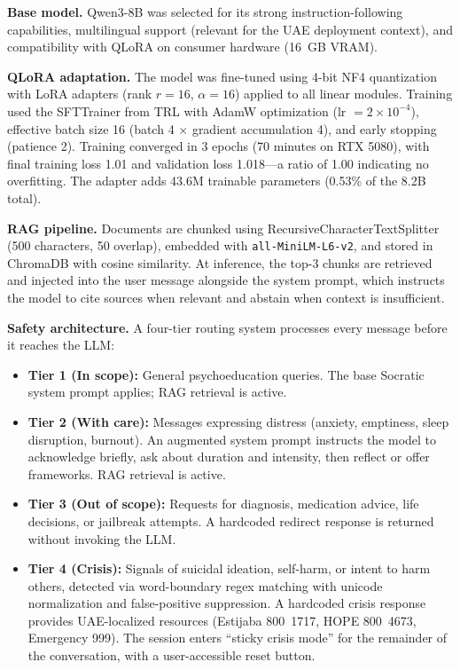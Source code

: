 \documentclass[conference]{IEEEtran}
\begin{document}
\textbf{Base model.} Qwen3-8B was selected for its strong instruction-following capabilities, multilingual support (relevant for the UAE deployment context), and compatibility with QLoRA on consumer hardware (16~GB VRAM).

\textbf{QLoRA adaptation.} The model was fine-tuned using 4-bit NF4 quantization with LoRA adapters (rank $r=16$, $\alpha=16$) applied to all linear modules. Training used the SFTTrainer from TRL with AdamW optimization (lr $= 2 \times 10^{-4}$), effective batch size 16 (batch 4 $\times$ gradient accumulation 4), and early stopping (patience 2). Training converged in 3 epochs (70 minutes on RTX 5080), with final training loss 1.01 and validation loss 1.018---a ratio of 1.00 indicating no overfitting. The adapter adds 43.6M trainable parameters (0.53\% of the 8.2B total).

\textbf{RAG pipeline.} Documents are chunked using RecursiveCharacterTextSplitter (500 characters, 50 overlap), embedded with \texttt{all-MiniLM-L6-v2}, and stored in ChromaDB with cosine similarity. At inference, the top-3 chunks are retrieved and injected into the user message alongside the system prompt, which instructs the model to cite sources when relevant and abstain when context is insufficient.

\textbf{Safety architecture.} A four-tier routing system processes every message before it reaches the LLM:

\begin{itemize}
\item \textbf{Tier 1 (In scope):} General psychoeducation queries. The base Socratic system prompt applies; RAG retrieval is active.
\item \textbf{Tier 2 (With care):} Messages expressing distress (anxiety, emptiness, sleep disruption, burnout). An augmented system prompt instructs the model to acknowledge briefly, ask about duration and intensity, then reflect or offer frameworks. RAG retrieval is active.
\item \textbf{Tier 3 (Out of scope):} Requests for diagnosis, medication advice, life decisions, or jailbreak attempts. A hardcoded redirect response is returned without invoking the LLM.
\item \textbf{Tier 4 (Crisis):} Signals of suicidal ideation, self-harm, or intent to harm others, detected via word-boundary regex matching with unicode normalization and false-positive suppression. A hardcoded crisis response provides UAE-localized resources (Estijaba 800~1717, HOPE 800~4673, Emergency 999). The session enters ``sticky crisis mode'' for the remainder of the conversation, with a user-accessible reset button.
\end{itemize}
\end{document}

